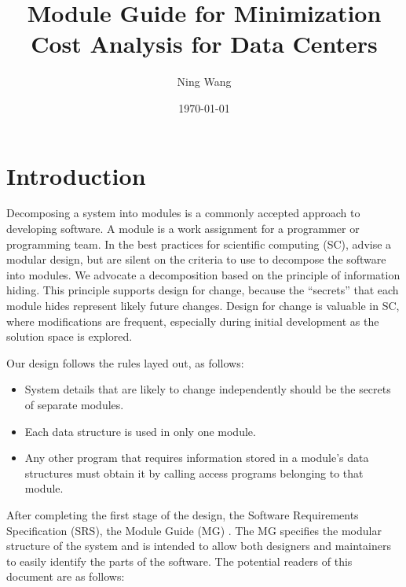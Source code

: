 \documentclass[12pt]{article}
\begin{document}
\title{Module Guide for Minimization Cost Analysis for Data Centers } 
\author{Ning Wang}
\date{\today}
	
\maketitle

\tableofcontents

\newpage

\section{Introduction}

Decomposing a system into modules is a commonly accepted approach to developing
software.  A module is a work assignment for a programmer or programming
team.  In the best practices for scientific computing (SC), advise a modular design, but are silent on the criteria
to use to decompose the software into modules.  We advocate a decomposition
based on the principle of information hiding.  This
principle supports design for change, because the ``secrets'' that each module
hides represent likely future changes.  Design for change is valuable in SC,
where modifications are frequent, especially during initial development as the
solution space is explored.  

Our design follows the rules layed out, as follows:
\begin{itemize}
\item System details that are likely to change independently should be the
  secrets of separate modules.
\item Each data structure is used in only one module.
\item Any other program that requires information stored in a module's data
  structures must obtain it by calling access programs belonging to that module.
\end{itemize}

After completing the first stage of the design, the Software Requirements
Specification (SRS), the Module Guide (MG) . The MG
specifies the modular structure of the system and is intended to allow both
designers and maintainers to easily identify the parts of the software.  The
potential readers of this document are as follows:
\end{document}
